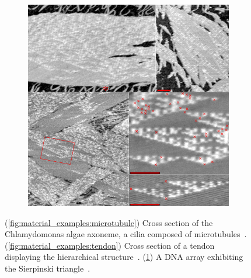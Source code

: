 \begin{figure}
\begin{subfigure}{0.32\linewidth}
    \includegraphics[height=\myMinHeight]{../../img/Rothemund-DNA-SierpinskiGasket}
    \caption{}\label{fig:material_examples:sierpinski}
  \end{subfigure}%
  \caption{(\ref{fig:material_examples:microtubule}) Cross section of the Chlamydomonas algae axoneme, a cilia composed of microtubules~\cite{wikimediacommons2007cilia}. (\ref{fig:material_examples:tendon}) Cross section of a tendon displaying the hierarchical structure~\cite{lecture_biosolid_mechanics}. (\ref{fig:material_examples:sierpinski}) A DNA array exhibiting the Sierpinski triangle~\cite{wikimediacommons2007dna}.}\label{fig:material_examples}
\end{figure}%





